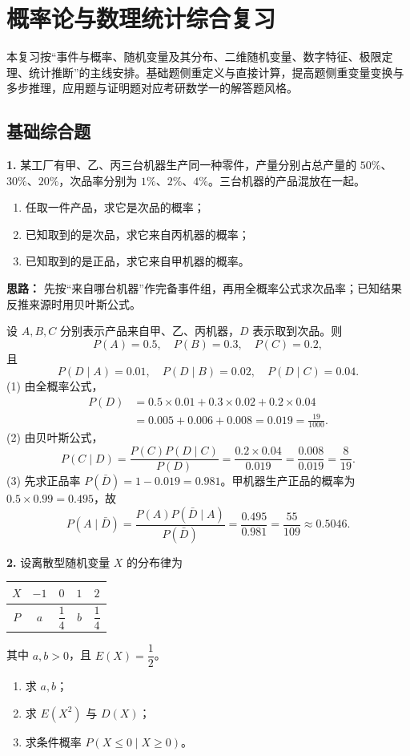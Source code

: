 \newpage
\section{概率论与数理统计综合复习}

\noindent 本复习按“事件与概率、随机变量及其分布、二维随机变量、数字特征、极限定理、统计推断”的主线安排。基础题侧重定义与直接计算，提高题侧重变量变换与多步推理，应用题与证明题对应考研数学一的解答题风格。

\subsection{基础综合题}

\textbf{1.} 某工厂有甲、乙、丙三台机器生产同一种零件，产量分别占总产量的 $50\%$、$30\%$、$20\%$，次品率分别为 $1\%$、$2\%$、$4\%$。三台机器的产品混放在一起。
\begin{enumerate}
    \item[(1)] 任取一件产品，求它是次品的概率；
    \item[(2)] 已知取到的是次品，求它来自丙机器的概率；
    \item[(3)] 已知取到的是正品，求它来自甲机器的概率。
\end{enumerate}

\ifshowsolutions%
\textbf{思路：} 先按“来自哪台机器”作完备事件组，再用全概率公式求次品率；已知结果反推来源时用贝叶斯公式。

设 $A,B,C$ 分别表示产品来自甲、乙、丙机器，$D$ 表示取到次品。则
\[
P(A)=0.5,\quad P(B)=0.3,\quad P(C)=0.2,
\]
且
\[
P(D\mid A)=0.01,\quad P(D\mid B)=0.02,\quad P(D\mid C)=0.04.
\]
(1) 由全概率公式，
\[
\begin{aligned}
P(D)&=0.5\times0.01+0.3\times0.02+0.2\times0.04\\
&=0.005+0.006+0.008=0.019=\frac{19}{1000}.
\end{aligned}
\]
(2) 由贝叶斯公式，
\[
P(C\mid D)=\frac{P(C)P(D\mid C)}{P(D)}
=\frac{0.2\times0.04}{0.019}
=\frac{0.008}{0.019}=\frac{8}{19}.
\]
(3) 先求正品率 $P(\bar D)=1-0.019=0.981$。甲机器生产正品的概率为 $0.5\times0.99=0.495$，故
\[
P(A\mid\bar D)=\frac{P(A)P(\bar D\mid A)}{P(\bar D)}
=\frac{0.495}{0.981}=\frac{55}{109}\approx0.5046.
\]

\else \answerarea[8] \fi%

\textbf{2.} 设离散型随机变量 $X$ 的分布律为
\begin{center}
\begin{tabular}{c|cccc}
$X$ & $-1$ & $0$ & $1$ & $2$\\
\hline
$P$ & $a$ & $\dfrac14$ & $b$ & $\dfrac14$
\end{tabular}
\end{center}
其中 $a,b>0$，且 $E(X)=\dfrac12$。
\begin{enumerate}
    \item[(1)] 求 $a,b$；
    \item[(2)] 求 $E(X^2)$ 与 $D(X)$；
    \item[(3)] 求条件概率 $P(X\leq0\mid X\geq0)$。
\end{enumerate}

